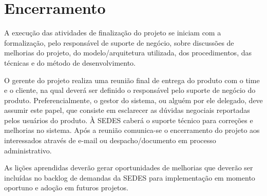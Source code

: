 \section{Encerramento}
\label{sec:atividadesRealizadasEncerramento}

A execução das atividades de finalização do projeto se iniciam com a formalização, pelo responsável de suporte de negócio, sobre discussões de melhorias do projeto, do modelo/arquitetura utilizada, dos  procedimentos, das técnicas e do método de desenvolvimento. 

O gerente do projeto realiza uma reunião final de entrega do produto com o time e o cliente, na qual deverá ser definido o responsável pelo suporte de negócio do produto. Preferencialmente, o gestor do sistema, ou alguém por ele delegado, deve assumir este papel, que consiste em esclarecer as dúvidas negociais reportadas pelos usuários do produto. À SEDES caberá o suporte técnico para correções e melhorias no sistema. Após a reunião comunica-se o encerramento do projeto aos interessados através de e-mail ou despacho/documento em processo administrativo.

As lições aprendidas deverão gerar oportunidades de melhorias que deverão ser incluídas no backlog de demandas da SEDES para implementação em momento oportuno e adoção em futuros projetos.